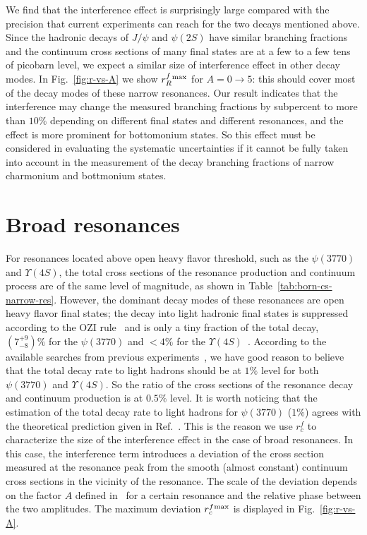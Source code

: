\documentclass[%
preprint,
 amsmath,amssymb,
 aps,
]{revtex4-2}
\newcommand{\psip}{\psi(2S)}
\newcommand{\psipp}{\psi(3770)}
\newcommand{\jpsi}{J/\psi}
\begin{document}
We find that the interference effect is surprisingly large compared with 
the precision that current experiments can reach for the two decays mentioned above. 
Since the hadronic decays of $\jpsi$ and $\psip$ have similar branching fractions
and the continuum cross sections of many final states are at a few to a few tens of
picobarn level, we expect a similar size of interference effect in other decay modes. 
In Fig.~\ref{fig:r-vs-A} we show $r_{R}^{f}{}^{\rm max}$ for $A=0\to 5$: this should cover most 
of the decay modes of these narrow resonances. Our result indicates that the interference
may change the measured branching fractions by subpercent to more than $10\%$ depending 
on different final states and different resonances, and the effect is more prominent for bottomonium states.
So this effect must be considered in evaluating the systematic uncertainties if it cannot be fully taken 
into account in the measurement of the decay branching fractions of narrow charmonium and bottmonium 
states. 

\section{Broad resonances}\label{ch:wide-res}

For resonances located above open heavy flavor threshold, such as the $\psipp$ 
and $\Upsilon(4S)$, the total cross sections of the resonance production
and continuum process are of the same level of magnitude, as shown in
Table~\ref{tab:born-cs-narrow-res}. However, the dominant decay modes of
these resonances are open heavy flavor final states; 
the decay into light hadronic final states is suppressed according to the OZI 
rule~\cite{ozi} and is only a tiny fraction of the total decay,
$(7^{+9}_{-8})\%$ for the $\psipp$ and $<4\%$ for the $\Upsilon(4S)$~\cite{pdg2020}. 
According to the available searches from previous 
experiments~\cite{BESIII:2021ftf,BESIII:ppbar,BESIII:pppi0,BESIII:2013ujm,BES:2007zan,CLEO:2005tkm,CLEO:2005zrs,Belle:2013hkg,Belle:2009rfa}, 
we have good reason to believe that the total decay rate to light hadrons should be 
at $1\%$ level for both $\psipp$ and $\Upsilon(4S)$. So the ratio
of the cross sections of the resonance decay and continuum production is at $0.5\%$ level.
It is worth noticing that the estimation of the total decay rate
to light hadrons for $\psipp$ ($1\%$) agrees with the theoretical prediction given in 
Ref.~\cite{He:2008xb}.
This is the reason we use $r_{c}^{f}$ to characterize the size of the 
interference effect in the case of broad resonances. In this case, the interference term 
introduces a deviation of the cross section measured at the resonance peak
from the smooth (almost constant) continuum cross sections in the vicinity 
of the resonance. The scale of the deviation depends on the factor $A$ 
defined in~ for a certain resonance and the relative phase between 
the two amplitudes. The maximum deviation $r_{c}^{f}{}^{\rm max}$ is displayed
in Fig.~\ref{fig:r-vs-A}. 
\end{document}
